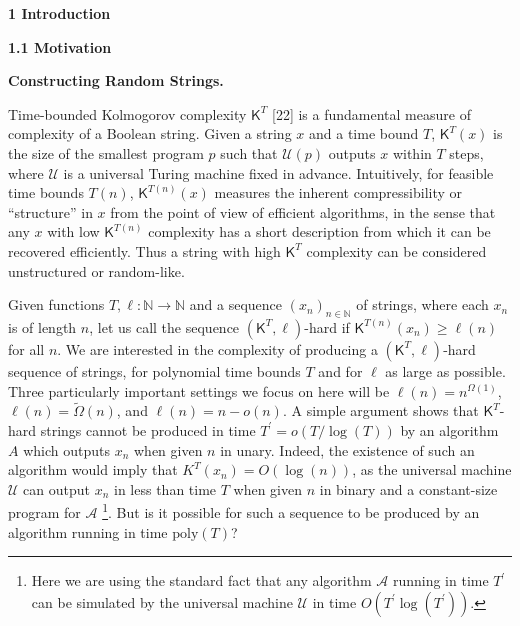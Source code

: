 

\par\medskip\noindent\textbf{
1 Introduction}\par




\par\medskip\noindent\textbf{
1.1 Motivation}\par




\par\medskip\noindent\textbf{Constructing Random Strings.}\par




Time-bounded Kolmogorov complexity ${\mathsf{K}}^{T}$ [22] is a fundamental measure of complexity of a Boolean string. Given a string $x$ and a time bound $T$, ${\mathsf{K}}^{T}(x)$ is the size of the smallest program $p$ such that $\mathcal{U}(p)$ outputs $x$ within $T$ steps, where $\mathcal{U}$ is a universal Turing machine fixed in advance. Intuitively, for feasible time bounds $T(n)$, ${\mathsf{K}}^{T(n)}(x)$ measures the inherent compressibility or “structure” in $x$ from the point of view of efficient algorithms, in the sense that any $x$ with low ${\mathsf{K}}^{T(n)}$ complexity has a short description from which it can be recovered efficiently. Thus a string with high ${\mathsf{K}}^{T}$ complexity can be considered unstructured or random-like.\par




Given functions $T,\ell:\mathbb{N}\rightarrow\mathbb{N}$ and a sequence $(x_{n})_{n\in\mathbb{N}}$ of strings, where each $x_{n}$ is of length $n$, let us call the sequence $({\mathsf{K}}^{T},\ell)$-hard if ${\mathsf{K}}^{T(n)}(x_{n})\geq\ell(n)$ for all $n$. We are interested in the complexity of producing a $({\mathsf{K}}^{T},\ell)$-hard sequence of strings, for polynomial time bounds $T$ and for $\ell$ as large as possible. Three particularly important settings we focus on here will be $\ell(n)=n^{\Omega(1)}$, $\ell(n)=\tilde{\Omega}(n)$, and $\ell(n)=n-o(n)$. A simple argument shows that ${\mathsf{K}}^{T}$-hard strings cannot be produced in time $T^{\prime}=o(T/\log(T))$ by an algorithm $A$ which outputs $x_{n}$ when given $n$ in unary. Indeed, the existence of such an algorithm would imply that $K^{T}(x_{n})=O(\log(n))$, as the universal machine $\mathcal{U}$ can output $x_{n}$ in less than time $T$ when given $n$ in binary and a constant-size program for $\mathcal{A}$ \footnote{Here we are using the standard fact that any algorithm $\mathcal{A}$ running in time $T^{\prime}$ can be simulated by the universal machine $\mathcal{U}$ in time $O(T^{\prime}\log(T^{\prime}))$.}. But is it possible for such a sequence to be produced by an algorithm running in time $\mathrm{poly}(T)$? 

